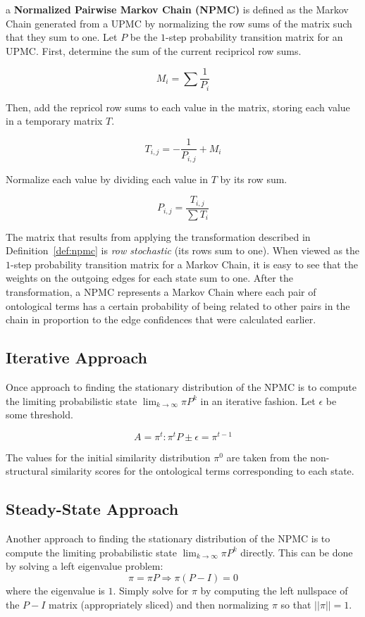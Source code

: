 \documentclass[letterpaper,twocolumn,12pt]{article}
\begin{document}
\begin{defn}
\label{def:npmc}
a {\bf Normalized Pairwise Markov Chain (NPMC)} is defined as the Markov Chain generated from a UPMC by normalizing the row sums of the matrix such that they sum to one. Let $P$ be the $1$-step probability transition matrix for an UPMC. First, determine the sum of the current recipricol row sums.

$$ M_i = \sum \frac{1}{P_i} $$

\noindent Then, add the repricol row sums to each value in the matrix, storing each value in a temporary matrix $T$.

$$ T_{i,j} = -\frac{1}{P_{i,j}} + M_i $$

\noindent Normalize each value by dividing each value in $T$ by its row sum.

$$ P_{i,j} = \frac{T_{i,j}}{\sum T_i} $$
\end{defn}

\noindent The matrix that results from applying the transformation described in Definition~\ref{def:npmc} is \textit{row stochastic} (its rows sum to one).
When viewed as the $1$-step probability transition matrix for a Markov Chain, it is easy to see that the weights on the outgoing edges for each state sum to one.
After the transformation, a NPMC represents a Markov Chain where each pair of ontological terms has a certain probability of being related to other pairs in the chain in proportion to the edge confidences that were calculated earlier.

\subsection{Iterative Approach}

Once approach to finding the stationary distribution of the NPMC is to compute the limiting probabilistic state $\lim_{k \to \infty} \pi P^k$ in an iterative fashion. 
Let $\epsilon$ be some threshold.

$$ A = \pi^t : \pi^t P \pm \epsilon = \pi^{t-1} $$

\noindent The values for the initial similarity distribution $\pi^0$ are taken from the non-structural similarity scores for the ontological terms corresponding to each state.

\subsection{Steady-State Approach}

Another approach to finding the stationary distribution of the NPMC is to compute the limiting probabilistic state $\lim_{k \to \infty} \pi P^k$ directly.
This can be done by solving a left eigenvalue problem: 
$$ \pi = \pi P \Rightarrow \pi (P - I) = 0$$
where the eigenvalue is $1$. 
Simply solve for $\pi$ by computing the left nullspace of the $P - I$ matrix (appropriately sliced) and then normalizing $\pi$ so that $\vert\vert \pi \vert\vert = 1$.
\end{document}
